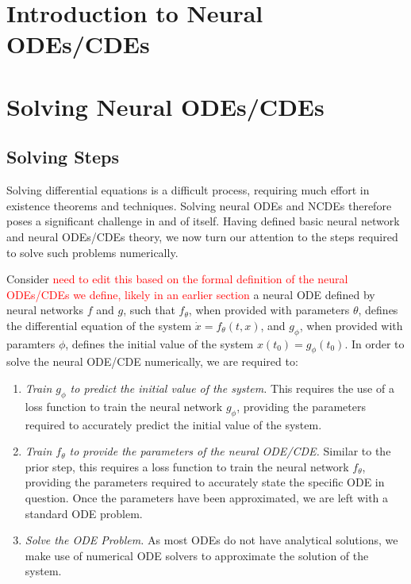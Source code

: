 \documentclass[a4paper,11pt, titlepage]{article}
\theoremstyle{definition}
\theoremstyle{plain}
\theoremstyle{remark}
\begin{document}
\section{Introduction to Neural ODEs/CDEs}

\section{Solving Neural ODEs/CDEs}

\subsection{Solving Steps}

Solving differential equations is a difficult process, requiring much effort in existence theorems and techniques. Solving neural ODEs and NCDEs therefore poses a significant challenge in and of itself. Having defined basic neural network and neural ODEs/CDEs theory, we now turn our attention to the steps required to solve such problems numerically.

Consider \textcolor{red}{need to edit this based on the formal definition of the neural ODEs/CDEs we define, likely in an earlier section} a neural ODE defined by neural networks $f$ and $g$, such that $f_\theta$, when provided with parameters $\theta$, defines the differential equation of the system $\dot{x} = f_\theta\left(t, x\right)$, and $g_\phi$, when provided with paramters $\phi$, defines the initial value of the system $x\left(t_0\right) = g_\phi(t_0)$. In order to solve the neural ODE/CDE numerically, we are required to: 
\begin{enumerate}
    \item \textit{Train $g_\phi$ to predict the initial value of the system.} This requires the use of a loss function to train the neural network $g_\phi$, providing the parameters required to accurately predict the initial value of the system. 
    \item \textit{Train $f_\theta$ to provide the parameters of the neural ODE/CDE.} Similar to the prior step, this requires a loss function to train the neural network $f_\theta$, providing the parameters required to accurately state the specific ODE in question. Once the parameters have been approximated, we are left with a standard ODE problem.
    \item \textit{Solve the ODE Problem.} As most ODEs do not have analytical solutions, we make use of numerical ODE solvers to approximate the solution of the system.
\end{enumerate}
\end{document}
